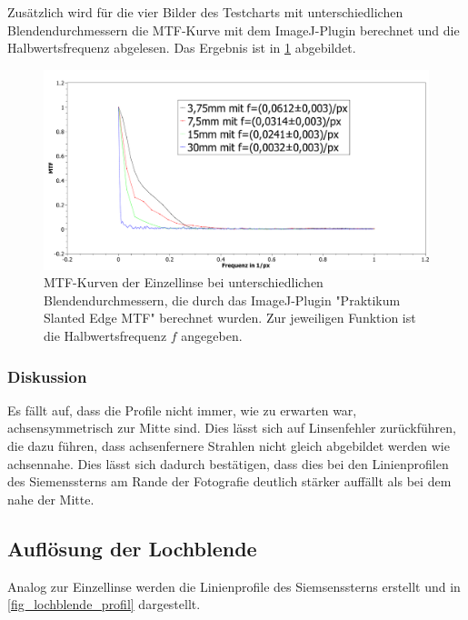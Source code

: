 \documentclass[
	a4paper,
	12pt,
	pagesize,
	ngerman
]{scrartcl}
\begin{document}
	Zusätzlich wird für die vier Bilder des Testcharts mit unterschiedlichen Blendendurchmessern die MTF-Kurve  mit dem ImageJ-Plugin berechnet und die Halbwertsfrequenz abgelesen.
	Das Ergebnis ist in \cref{fig_einzel_mtf} abgebildet.
	
	\begin{figure}[H]  
		\includegraphics[width=1\textwidth]{fig_Einzellinse_MTF}
		\centering
		\caption{
			MTF-Kurven der Einzellinse bei unterschiedlichen Blendendurchmessern, die durch das ImageJ-Plugin "Praktikum Slanted Edge MTF" berechnet wurden.
			Zur jeweiligen Funktion ist die Halbwertsfrequenz $f$ angegeben.
		}
		\label{fig_einzel_mtf}
		\centering
	\end{figure}
	
	

	\subsubsection{Diskussion}
	
	Es fällt auf, dass die Profile nicht immer, wie zu erwarten war, achsensymmetrisch zur Mitte sind.
	Dies lässt sich auf Linsenfehler zurückführen, die dazu führen, dass achsenfernere Strahlen nicht gleich abgebildet werden wie achsennahe.
	Dies lässt sich dadurch bestätigen, dass dies bei den Linienprofilen des Siemenssterns am Rande der Fotografie deutlich stärker auffällt als bei dem nahe der Mitte.
	
	
	
	
	\subsection{Auflösung der Lochblende}
	Analog zur Einzellinse werden die Linienprofile des Siemsenssterns erstellt und in \cref{fig_lochblende_profil} dargestellt.
	
\end{document}
